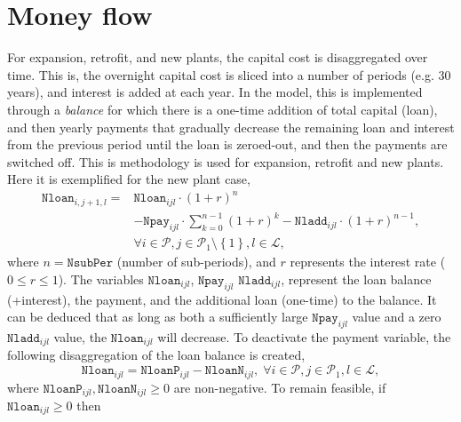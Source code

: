 \documentclass{amsbook}
\begin{document}

%
\section{Money flow}
%
For expansion, retrofit, and new plants, the capital cost is disaggregated over
time. This is, the overnight capital cost is sliced into a number of periods
(e.g.  30 years), and interest is added at each year. In the model, this is
implemented through a \emph{balance} for which there is a one-time addition of
total capital (loan), and then yearly payments that gradually decrease the
remaining loan and interest from the previous period until the loan is
zeroed-out, and then the payments are switched off. 
%
This is methodology is used for expansion, retrofit and new plants. Here it is
exemplified for the new plant case,
%
\begin{equation}\begin{split}
    \mathtt{Nloan}_{i,j+1,l} =& \mathtt{Nloan}_{ijl} \cdot \left(1+r\right)^n \\
    &- \mathtt{Npay}_{ijl} \cdot \sum^{n-1}_{k=0} \left(1+r\right)^k 
    - \mathtt{Nladd}_{ijl} \cdot \left(1+r\right)^{n-1}, \\
    &\forall i \in \mathcal{P} ,
    j \in \mathcal{P}_1 \setminus \left\{1\right\},
    l \in \mathcal{L},
\end{split}\end{equation}
%
where $n=\mathtt{NsubPer}$ (number of sub-periods), and $r$ represents the
interest rate ($0\leq r\leq 1$). The variables $\mathtt{Nloan}_{ijl}$,
$\mathtt{Npay}_{ijl}$ $\mathtt{Nladd}_{ijl}$, represent the loan balance
(+interest), the payment, and the additional loan (one-time) to the balance. It
can be deduced that as long as both a sufficiently large $\mathtt{Npay}_{ijl}$
value and a zero $\mathtt{Nladd}_{ijl}$ value, the $\mathtt{Nloan}_{ijl}$ will
decrease. 
%
To deactivate the payment variable, the following disaggregation of the loan
balance is created,
%
\begin{equation}
    \mathtt{Nloan}_{ijl} = \mathtt{NloanP}_{ijl} - \mathtt{NloanN}_{ijl}
    , \; \forall i\in \mathcal{P}, j\in \mathcal{P}_1, l\in \mathcal{L},
\end{equation}
%
where $\mathtt{NloanP}_{ijl}, \mathtt{NloanN}_{ijl}\geq 0$ are non-negative. 
To remain feasible, if $\mathtt{Nloan}_{ijl} \ge 0$ then 
\end{document}
